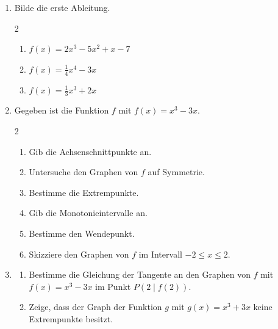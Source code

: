 \begin{enumerate}
  \item \leicht Bilde die erste Ableitung.
  \begin{multicols}{2}
  \begin{enumerate}
    \item $f(x) = 2x^3 - 5x^2 + x - 7$ 
    \item $f(x) = \frac14 x^4 - 3x$ 
    \item $f(x) = \frac13 x^3 + 2x$ 
  \end{enumerate}
  \end{multicols}

  \item \mittel Gegeben ist die Funktion $f$ mit $f(x) = x^3 - 3x$.
  \begin{multicols}{2}
  \begin{enumerate}
    \item Gib die Achsenschnittpunkte an. 
    \item Untersuche den Graphen von $f$ auf Symmetrie. 
    \item Bestimme die Extrempunkte. 
    \item Gib die Monotonieintervalle an. 
    \item Bestimme den Wendepunkt. 
    \item Skizziere den Graphen von $f$ im Intervall $-2 \le x \le 2$. 
  \end{enumerate}
  \end{multicols}
  \begin{center}
  \end{center}

  \item \schwer
  \begin{enumerate}
    \item Bestimme die Gleichung der Tangente an den Graphen von $f$ mit
          $f(x) = x^3 - 3x$ im Punkt $P(2 \mid f(2))$. 
    \item Zeige, dass der Graph der Funktion $g$ mit $g(x) = x^3 + 3x$ keine
          Extrempunkte besitzt. 
  \end{enumerate}
\end{enumerate}

